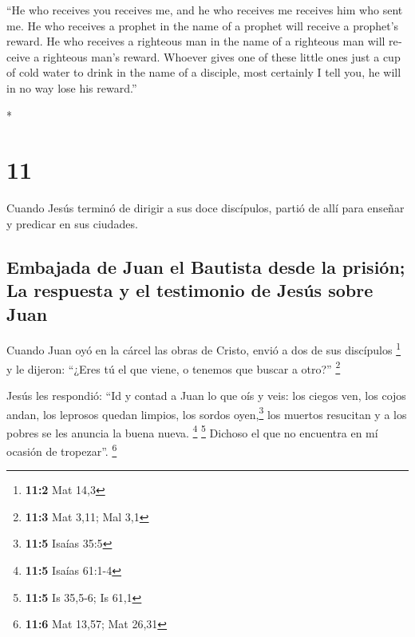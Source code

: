 \begin{paracol}{2}
\begin{otherlanguage}{english}
 ``He who receives you receives me, and he who receives
me receives him who sent me.  He who receives a prophet
in the name of a prophet will receive a prophet's reward. He who
receives a righteous man in the name of a righteous man will receive a
righteous man's reward.  Whoever gives one of these
little ones just a cup of cold water to drink in the name of a disciple,
most certainly I tell you, he will in no way lose his reward.''

\end{otherlanguage}

\switchcolumn[0]*

\hypertarget{section-20}{%
\section{11}\label{section-20}}

 Cuando Jesús terminó de dirigir a sus doce discípulos,
partió de allí para enseñar y predicar en sus ciudades.

\hypertarget{embajada-de-juan-el-bautista-desde-la-prisiuxf3n-la-respuesta-y-el-testimonio-de-jesuxfas-sobre-juan}{%
\subsection{Embajada de Juan el Bautista desde la prisión; La respuesta
y el testimonio de Jesús sobre
Juan}\label{embajada-de-juan-el-bautista-desde-la-prisiuxf3n-la-respuesta-y-el-testimonio-de-jesuxfas-sobre-juan}}

 Cuando Juan oyó en la cárcel las obras de Cristo, envió a
dos de sus discípulos \footnote{\textbf{11:2} Mat 14,3}  y
le dijeron: ``¿Eres tú el que viene, o tenemos que buscar a otro?''
\footnote{\textbf{11:3} Mat 3,11; Mal 3,1}

 Jesús les respondió: ``Id y contad a Juan lo que oís y
veis:  los ciegos ven, los cojos andan, los leprosos
quedan limpios, los sordos oyen,\footnote{\textbf{11:5} Isaías 35:5} los
muertos resucitan y a los pobres se les anuncia la buena nueva.
\footnote{\textbf{11:5} Isaías 61:1-4} \footnote{\textbf{11:5} Is
  35,5-6; Is 61,1}  Dichoso el que no encuentra en mí
ocasión de tropezar''. \footnote{\textbf{11:6} Mat 13,57; Mat 26,31}


\end{paracol}
